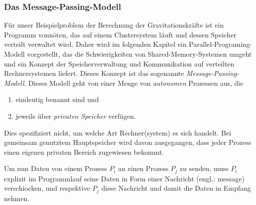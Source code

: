       \subsubsection{Das Message-Passing-Modell}
      \label{sec:mpm}
      Für unser Beispielproblem der Berechnung der Gravitationskräfte ist ein Programm vonnöten, das auf einem Clustersystem läuft und dessen Speicher verteilt verwaltet wird.
      Daher wird im folgenden Kapitel ein Parallel-Programing-Modell vorgestellt, das die Schwierigkeiten von Shared-Memory-Systemen umgeht und ein Konzept der Speicherverwaltung 
      und Kommunikation auf verteilten Rechnersystemen liefert.
      Dieses Konzept ist das sogenannte \textit{Message-Passing-Modell}. 
      Dieses Modell geht von einer Menge von \textit{autonomen} Prozessen aus, die
      \begin{enumerate}
       \item eindeutig benannt sind und
       \item jeweils über \textit{privaten Speicher} verfügen.
      \end{enumerate}
      Dies spezifiziert nicht, um welche Art Rechner(system) es sich handelt. Bei gemeinsam genutztem Hauptspeicher wird davon ausgegangen, dass jeder Prozess einen eigenen privaten 
      Bereich zugewiesen bekommt.
      
      Um nun Daten von einem Prozess $P_i$ an einen Prozess $P_j$ zu senden, muss $P_i$ explizit im Programmlauf seine Daten in Form einer Nachricht (engl.: message) verschiocken, und
      respektive $P_j$ diese Nachricht und damit die Daten in Empfang nehmen. 
      
